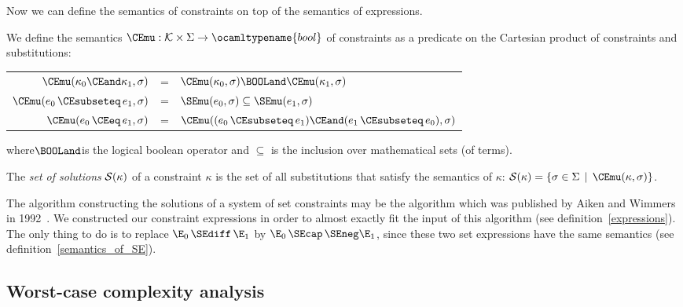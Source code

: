 \begin{itemize}
\end{itemize}

Now we can define the semantics of constraints on top of the semantics
of expressions.

\begin{Def}
We define the semantics $\CEmu : {\cal K} \times \Sigma \rightarrow
\ocamltypename{bool}$ of constraints as a predicate on the Cartesian
product of constraints and substitutions:

\begin{center}
\begin{tabular}{rcl}
  $\CEmu(\kappa_0 \CEand \kappa_1,\sigma)$
    & = & $\CEmu(\kappa_0,\sigma) \BOOLand
          \CEmu(\kappa_1,\sigma)$ \\ 
  $\CEmu(e_0 \, \CEsubseteq \, e_1,\sigma)$
    & = & $\SEmu(e_0,\sigma) \subseteq \SEmu(e_1,\sigma)$\\
  $\CEmu(e_0 \, \CEeq \, e_1,\sigma)$
    & = & 
  $\CEmu((e_0 \, \CEsubseteq \, e_1)
         \CEand 
         (e_1 \, \CEsubseteq \, e_0),
         \sigma)$
\end{tabular}
\end{center}

\noindent
where $\!\!\BOOLand\!\!$ is the logical boolean operator and
$\subseteq$ is the inclusion over mathematical sets (of terms).
\end{Def}

\begin{Def}[Solutions]
The \emph{set of solutions} ${\cal S}(\kappa)$ of a constraint
$\kappa$ is the set of all substitutions that satisfy the semantics of
$\kappa$: ${\cal S}(\kappa) = \{ \sigma \in \Sigma \, \mid \,
\CEmu(\kappa,\sigma) \}$.
\end{Def}

The algorithm constructing the solutions of a system of set
constraints may be the algorithm which was published by Aiken and
Wimmers in 1992~\cite{AikenWimmers:1992}. We constructed our
constraint expressions in order to almost exactly fit the input of
this algorithm (see definition~\ref{expressions}). The only thing to
do is to replace $\E_0 \, \SEdiff \, \E_1$ by $\E_0 \, \SEcap \,
\SEneg\E_1$, since these two set expressions have the same semantics
(see definition~\ref{semantics_of_SE}).

\subsection{Worst-case complexity analysis}

